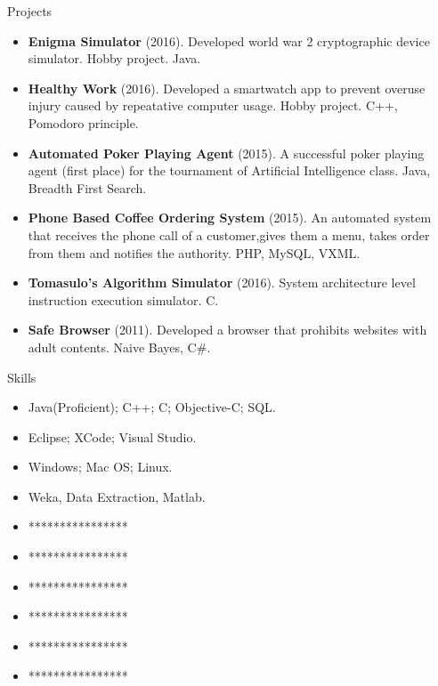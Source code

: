 \documentclass[]{mcdowellcv}
\begin{document}
	
	\begin{cvsection}{Projects}
		\begin{cvsubsection}{}{}{}
			\begin{itemize}
			\item \textbf{Enigma Simulator} (2016).  Developed world war 2 cryptographic device simulator. Hobby project.  Java.
				\item \textbf{Healthy Work} (2016). Developed a smartwatch app to prevent overuse injury caused by repeatative computer usage. Hobby project. C++, Pomodoro principle.				
				\item \textbf{Automated Poker Playing Agent} (2015). A successful poker playing agent (first place) for the tournament of Artificial Intelligence class. Java, Breadth First Search.
				\item \textbf{Phone Based Coffee Ordering System} (2015). An automated system that receives the phone call of a customer,gives them a menu, takes order from them and notifies the authority.  PHP, MySQL, VXML.
			\item \textbf{Tomasulo’s Algorithm Simulator} (2016). System architecture level instruction execution simulator. C.	
\item \textbf{Safe Browser} (2011). Developed a browser that prohibits websites with adult contents. Naive Bayes, C\#.
			\end{itemize}
		\end{cvsubsection}
	\end{cvsection}
	
	
	\begin{cvsection}{Skills}
		\begin{cvsubsection}{}{}{}	
			\begin{itemize}
				\item Java(Proficient); C++; C; Objective-C; SQL.  
				\item Eclipse; XCode; Visual Studio.
				\item Windows; Mac OS; Linux. 
				\item Weka, Data Extraction, Matlab.
				\item ****************
				\item ****************
				\item ****************
				\item ****************
				\item ****************
				\item ****************
			\end{itemize}
		\end{cvsubsection}
	\end{cvsection}
	
\end{document}
